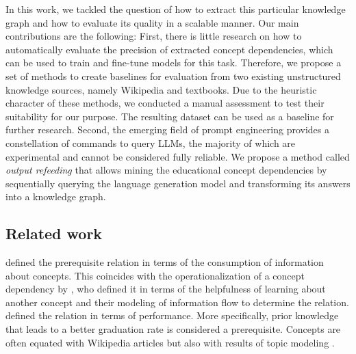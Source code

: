 \documentclass{article}
\begin{document}
In this work, we tackled the question of how to extract this particular knowledge graph and how to evaluate its quality in a scalable manner.
Our main contributions are the following:
First, there is little research on how to automatically evaluate the precision of extracted concept dependencies, which can be used to train and fine-tune models for this task. Therefore, we propose a set of methods to create baselines for evaluation from two existing unstructured knowledge sources, namely Wikipedia and textbooks. Due to the heuristic character of these methods, we conducted a manual assessment to test their suitability for our purpose. The resulting dataset can be used as a baseline for further research.
Second, the emerging field of prompt engineering provides a constellation of commands to query LLMs, the majority of which are experimental and cannot be considered fully reliable. We propose a method called \textit{output refeeding} that allows mining the educational concept dependencies by sequentially querying the language generation model and transforming its answers into a knowledge graph.

\subsection{Related work}
\cite{talukdar2012crowdsourced} defined the prerequisite relation in terms of the consumption of information about concepts. This coincides with the operationalization of a concept dependency by \cite{gordon-etal-2016-modeling}, who defined it in terms of the helpfulness of learning about another concept and their modeling of information flow to determine the relation. \cite{vuong2011method} defined the relation in terms of performance. More specifically, prior knowledge that leads to a better graduation rate is considered a prerequisite. Concepts are often equated with Wikipedia articles \citep{wang2016prerequisite} but also with results of topic modeling \citep{gordon-etal-2016-modeling}.
\end{document}
